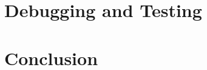 \documentclass[10pt]{article}
\begin{document}
\section{Debugging and Testing}

\section{Conclusion}
\end{document}
